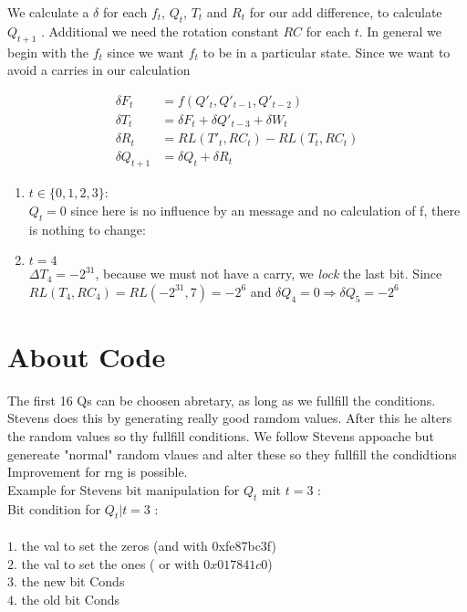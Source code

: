We calculate a $\delta$ for each $f_t$, $Q_t$, $T_t$ and $R_t$ for our add difference, to calculate $Q_{t+1}$ .
Additional we need the rotation constant $RC$ for each $t$. 
In general we begin with the $f_t$ since we want $f_t$ to be in a particular state.
Since we want to avoid a carries in our calculation 


\begin{align*}
    \delta F_t &= f \left( Q'_t,Q'_{t-1},Q'_{t-2} \right) \\
    \delta T_t &= \delta F_t + \delta  Q'_{t-3} + \delta W_t \\
    \delta R_t &=  RL \left(T'_t,RC_t \right) - RL \left(T_t,RC_t \right)\\
    \delta Q_{t+1} &= \delta Q_t + \delta R_t
\end{align*}


\begin{enumerate}
    \item $t \in \{0,1,2,3\}$:\\
     $Q_t = 0 $ since here is no influence by an message and no calculation of f, there is nothing to change:
    \item $t = 4$\\
    $\Delta T_4 = -2^{31}$, because we must not have a carry, we \textit{lock} the last bit.
    Since  $RL(T_4, RC_4) = RL(-2^{31}, 7) = -2^6 $ and $\delta Q_4 = 0 \Rightarrow  \delta Q_5 = -2^6$  
\end{enumerate}

\section{About Code}
The first 16 Qs can be choosen abretary, as long as we fullfill the conditions.\\
Stevens does this by generating really good ramdom values.
After this he alters the random values so thy fullfill conditions.
We follow Stevens appoache but genereate "normal" random vlaues and alter these so they fullfill the condidtions
Improvement for rng is possible. \\
Example for Stevens bit manipulation for $Q_t$ mit $t = 3$ :\\
Bit condition for $Q_t | t =3$ :\\
\\
$1.$ the val to set the zeros (and with 0xfe87bc3f)\\
$2.$ the val to set the ones ( or with $0x017841c0$)\\
$3.$ the new bit Conds\\
$4.$ the old bit Conds


